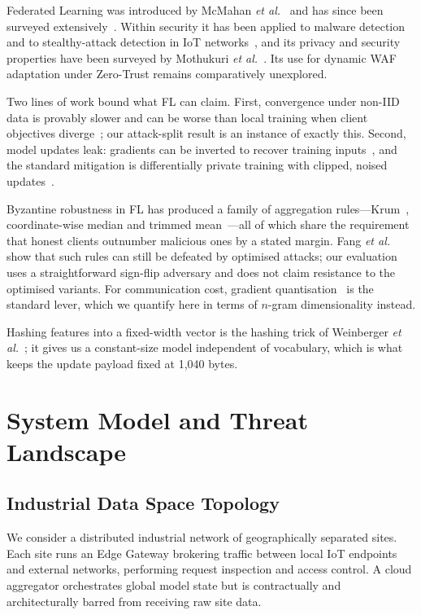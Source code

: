 \documentclass[conference]{IEEEtran}
\begin{document}
Federated Learning was introduced by McMahan \textit{et al.}~\cite{mcmahan2017} and has since been surveyed extensively~\cite{kairouz2021,yang2019,li2020}. Within security it has been applied to malware detection and to stealthy-attack detection in IoT networks~\cite{sun2020,nguyen2021}, and its privacy and security properties have been surveyed by Mothukuri \textit{et al.}~\cite{mothukuri2021}. Its use for dynamic WAF adaptation under Zero-Trust remains comparatively unexplored.

Two lines of work bound what FL can claim. First, convergence under non-IID data is provably slower and can be worse than local training when client objectives diverge~\cite{li2020convergence}; our attack-split result is an instance of exactly this. Second, model updates leak: gradients can be inverted to recover training inputs~\cite{zhu2019}, and the standard mitigation is differentially private training with clipped, noised updates~\cite{abadi2016}.

Byzantine robustness in FL has produced a family of aggregation rules---Krum~\cite{blanchard2017}, coordinate-wise median and trimmed mean~\cite{yin2018}---all of which share the requirement that honest clients outnumber malicious ones by a stated margin. Fang \textit{et al.}~\cite{fang2020} show that such rules can still be defeated by optimised attacks; our evaluation uses a straightforward sign-flip adversary and does not claim resistance to the optimised variants. For communication cost, gradient quantisation~\cite{alistarh2017} is the standard lever, which we quantify here in terms of $n$-gram dimensionality instead.

Hashing features into a fixed-width vector is the hashing trick of Weinberger \textit{et al.}~\cite{weinberger2009}; it gives us a constant-size model independent of vocabulary, which is what keeps the update payload fixed at 1{,}040 bytes.

\section{System Model and Threat Landscape}
\label{sec:model}

\subsection{Industrial Data Space Topology}
We consider a distributed industrial network of geographically separated sites. Each site runs an Edge Gateway brokering traffic between local IoT endpoints and external networks, performing request inspection and access control. A cloud aggregator orchestrates global model state but is contractually and architecturally barred from receiving raw site data.
\end{document}
